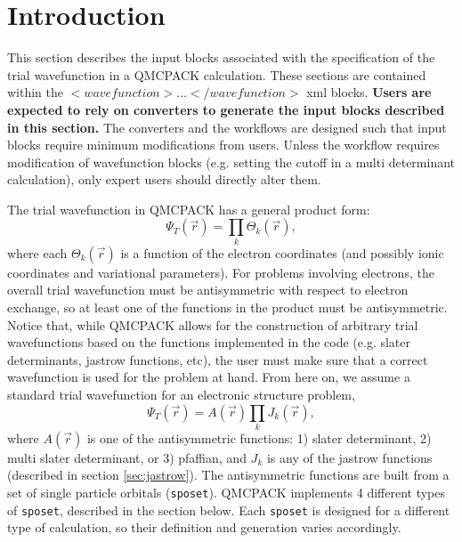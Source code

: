 \section{Introduction}
\label{sec:intro_wavefunction}

This section describes the input blocks associated with the specification of the trial wavefunction in a QMCPACK calculation. These sections are contained within the $<wavefunction > ...  </wavefunction>$ xml blocks. \textbf{Users are expected to rely on converters to generate the input blocks described in this section.} The converters and the workflows are designed such that input blocks require minimum modifications from users. Unless the workflow requires modification of wavefunction blocks (e.g. setting the cutoff in a multi determinant calculation), only expert users should directly alter them.
  
The trial wavefunction in QMCPACK has a general product form:
\begin{equation}
\Psi_T(\vec{r}) = \prod_k \Theta_k(\vec{r}),
\end{equation}
where each $\Theta_k(\vec{r})$ is a function of the electron coordinates (and possibly ionic coordinates and variational parameters). For problems involving electrons, the overall trial wavefunction must be antisymmetric with respect to electron exchange, so at least one of the functions in the product must be antisymmetric. Notice that, while QMCPACK allows for the construction of arbitrary trial wavefunctions based on the functions implemented in the code (e.g. slater determinants, jastrow functions, etc), the user must make sure that a correct wavefunction is used for the problem at hand. From here on, we assume a standard trial wavefunction for an electronic structure problem, 
\begin{equation}
\Psi_T(\vec{r}) =  \textit{A}(\vec{r}) \prod_k \textit{J}_k(\vec{r}),
\end{equation}
where $\textit{A}(\vec{r})$ is one of the antisymmetric functions: 1) slater determinant, 2) multi slater determinant, or 3) pfaffian, and $\textit{J}_k$ is any of the jastrow functions (described in section \ref{sec:jastrow}).  The antisymmetric functions are built from a set of single particle orbitals (\texttt{sposet}). QMCPACK implements 4 different types of \texttt{sposet}, described in the section below. Each \texttt{sposet} is designed for a different type of calculation, so their definition and generation varies accordingly. 
